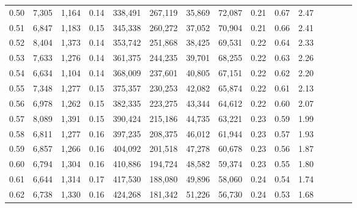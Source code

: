 \begin{tabular}{rrrcrrrrrrrrrrr}
0.50 &   7,305 &   1,164 &                                       0.14 &  338,491 &  267,119 &   35,869 &   72,087 &  0.21 &  0.67 &                         2.47 \\
0.51 &   6,847 &   1,183 &                                       0.15 &  345,338 &  260,272 &   37,052 &   70,904 &  0.21 &  0.66 &                         2.41 \\
0.52 &   8,404 &   1,373 &                                       0.14 &  353,742 &  251,868 &   38,425 &   69,531 &  0.22 &  0.64 &                         2.33 \\
0.53 &   7,633 &   1,276 &                                       0.14 &  361,375 &  244,235 &   39,701 &   68,255 &  0.22 &  0.63 &                         2.26 \\
0.54 &   6,634 &   1,104 &                                       0.14 &  368,009 &  237,601 &   40,805 &   67,151 &  0.22 &  0.62 &                         2.20 \\
0.55 &   7,348 &   1,277 &                                       0.15 &  375,357 &  230,253 &   42,082 &   65,874 &  0.22 &  0.61 &                         2.13 \\
0.56 &   6,978 &   1,262 &                                       0.15 &  382,335 &  223,275 &   43,344 &   64,612 &  0.22 &  0.60 &                         2.07 \\
0.57 &   8,089 &   1,391 &                                       0.15 &  390,424 &  215,186 &   44,735 &   63,221 &  0.23 &  0.59 &                         1.99 \\
0.58 &   6,811 &   1,277 &                                       0.16 &  397,235 &  208,375 &   46,012 &   61,944 &  0.23 &  0.57 &                         1.93 \\
0.59 &   6,857 &   1,266 &                                       0.16 &  404,092 &  201,518 &   47,278 &   60,678 &  0.23 &  0.56 &                         1.87 \\
0.60 &   6,794 &   1,304 &                                       0.16 &  410,886 &  194,724 &   48,582 &   59,374 &  0.23 &  0.55 &                         1.80 \\
0.61 &   6,644 &   1,314 &                                       0.17 &  417,530 &  188,080 &   49,896 &   58,060 &  0.24 &  0.54 &                         1.74 \\
0.62 &   6,738 &   1,330 &                                       0.16 &  424,268 &  181,342 &   51,226 &   56,730 &  0.24 &  0.53 &                         1.68 \\

\end{tabular}
